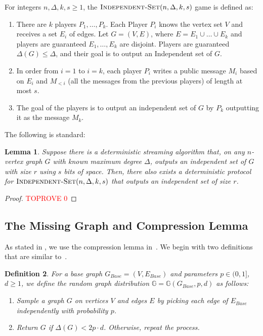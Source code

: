 \documentclass[11pt]{article}
\newtheorem{lemma}{Lemma}[section]
\newtheorem{definition}[lemma]{Definition}
\theoremstyle{definition}
\renewcommand{\leq}{\leqslant}
\renewcommand{\geq}{\geqslant}
\renewcommand{\le}{\leq}
\renewcommand{\ge}{\geq}
\begin{document}
\newcommand{\IndepSet}{\textnormal{\textsc{Independent-Set}}}

\begin{mdframed}
    For integers $n, \Delta, k, s\ge 1$, the $\IndepSet(n, \Delta, k, s)$ game is defined as:
    \begin{enumerate}
        \item There are $k$ players $P_1, \dots, P_k$. Each Player $P_i$ knows the vertex set $V$ and receives a set $E_i$ of edges. Let $G=(V, E)$, where $E=E_1\cup \dots\cup E_k$ and players are guaranteed $E_1,\dots, E_k$ are disjoint. Players are guaranteed $\Delta(G)\le \Delta$, and their goal is to output an Independent set of $G$.
        \item In order from $i=1$ to $i=k$, each player $P_i$ writes a public message $M_i$ based on $E_i$ and $M_{<i}$ (all the messages from the previous players) of length at most $s$. 
        \item The goal of the players is to output an independent set of $G$ by $P_k$ outputting it as the message $M_k$. 
    \end{enumerate}
\end{mdframed}

The following is standard:

\begin{lemma}\label{algo-to-players}
    Suppose there is a deterministic streaming algorithm that, on any $n$-vertex graph $G$ with known maximum degree $\Delta$, outputs an independent set of $G$ with size $r$ using $s$ bits of space. Then, there also exists a deterministic protocol for $\IndepSet(n,\Delta, k, s)$ that outputs an independent set of size $r$.
\end{lemma}
\begin{proof}\textcolor{red}{TOPROVE 0}\end{proof}

\subsection{The Missing Graph and Compression Lemma}

As stated in , we use the compression lemma in~\cite{assadi2022deterministic}. We begin with two definitions that are similar to~\cite{assadi2022deterministic}.

\begin{definition}
    For a base graph $G_{Base}=(V, E_{Base})$ and parameters $p\in (0, 1]$, $d\ge 1$, we define the random graph distribution $\mathbb{G}=\mathbb{G}(G_{Base}, p, d)$ as follows:
    \begin{enumerate}
        \item Sample a graph $G$ on vertices $V$ and edges $E$ by picking each edge of $E_{Base}$ independently with probability $p$. 
        \item Return $G$ if $\Delta{(G)}< 2p\cdot d$. Otherwise, repeat the process.
    \end{enumerate}
\end{definition}
\end{document}
